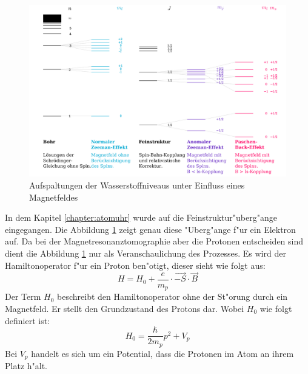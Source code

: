 \begin{figure}
	\includegraphics[width = \textwidth]{./mri/pic/index}
	\caption{Aufspaltungen der Wasserstoffniveaus unter Einfluss eines Magnetfeldes \cite{Zeeman}}
	\label{mri:quant:abb:zeeman}
\end{figure}
In dem Kapitel \ref{chapter:atomuhr} wurde auf die Feinstruktur"uberg"ange eingegangen. Die Abbildung \ref{mri:quant:abb:zeeman} zeigt genau diese "Uberg"ange f"ur ein Elektron auf. Da bei der Magnetresonanztomographie aber die Protonen entscheiden sind dient die Abbildung \ref{mri:quant:abb:zeeman} nur als Veranschaulichung des Prozesses. Es wird der Hamiltonoperator f"ur ein Proton ben"otigt, dieser sieht wie folgt aus:
\begin{equation}
H = H_0 + \frac{e}{m_p }\cdot \vec{-S} \cdot \vec{B}
\label{mri:hamilton}
\end{equation}
Der Term $H_0$ beschreibt den Hamiltonoperator ohne der St"orung durch ein Magnetfeld. Er stellt den Grundzustand des Protons dar. Wobei $H_0$ wie folgt definiert ist:
\begin{equation}
H_0 = \frac{\hbar}{2m_p} p^2 + V_p
\end{equation}
Bei $V_p$ handelt es sich um ein Potential, dass die Protonen im Atom an ihrem Platz h"alt.

